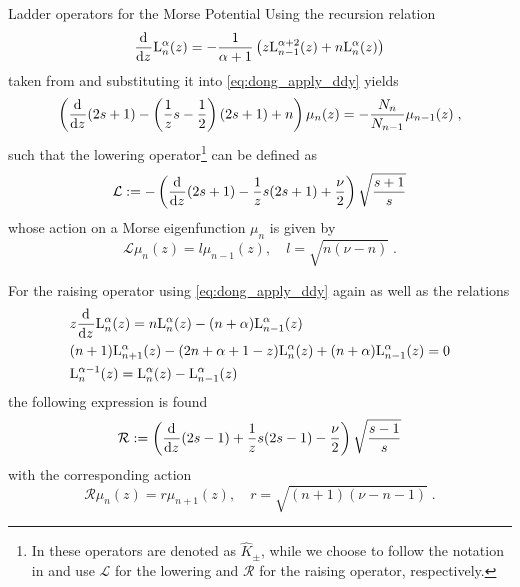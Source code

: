 \begin{chapter}{Ladder operators for the Morse Potential}
Using the recursion relation
\begin{equation}
	\label{eq:dong_ddy_rek}
	\frac{\mathrm{d}^{}}{\mathrm{d}z^{}}\mathrm{L}_{n}^\alpha(z)=-\frac{1}{\alpha+1}\left(z\mathrm{L}_{n-1}^{\alpha+2}(z)+n\mathrm{L}_{n}^\alpha(z)\right)
\end{equation}
taken from \cite{DongFactMethods} and substituting it into \eqref{eq:dong_apply_ddy} yields
\begin{equation}
    \left(\frac{\mathrm{d}^{}}{\mathrm{d}z^{}}(2s+1)-\left(\frac{1}{z}s-\frac{1}{2}\right)(2s+1)+n\right)\mu_n(z)=-\frac{N_n}{N_{n-1}}\mu_{n-1}(z) \;,
\end{equation}
such that the lowering operator\footnote{
    In \cite{Dong_ladder_operators} these operators are denoted as $\hat{K}_{\pm}$, while we choose to follow the notation in \cite{FGL_semiclassical_dynamics} 
    and use $\mathcal{L}$ for the lowering and $\mathcal{R}$ for the raising operator, respectively.}
can be defined as
\begin{equation}
    \label{eq:dong_lop}
    \mathcal{L}:=-\left(\frac{\mathrm{d}^{}}{\mathrm{d}z^{}}(2s+1)-\frac{1}{z}s(2s+1)+\frac{\nu}{2} \right)\sqrt{\frac{s+1}{s}}
\end{equation}
whose action on a Morse eigenfunction $\mu_n$ is given by
\begin{equation}
    \label{eq:dong_lop_action}
    \mathcal{L}\mu_n(z)=l\mu_{n-1}(z),\quad l=\sqrt{n(\nu-n)}\; .
\end{equation}

For the raising operator using \eqref{eq:dong_apply_ddy} again as well as the relations
\begin{align}
    &    z\frac{\mathrm{d}^{}}{\mathrm{d}z^{}}\mathrm{L}_n^\alpha(z)=n\mathrm{L}_n^{\alpha}(z)-(n+\alpha)\mathrm{L}_{n-1}^{\alpha}(z)\\
    &	(n+1)\mathrm{L}_{n+1}^{\alpha}(z)-(2n+\alpha+1-z)\mathrm{L}_n^{\alpha}(z)+(n+\alpha)\mathrm{L}_{n-1}^{\alpha}(z)=0\\
    &	\mathrm{L}_n^{\alpha-1}(z)=\mathrm{L}_n^{\alpha}(z)-\mathrm{L}_{n-1}^{\alpha}(z)
\end{align}
the following expression is found
\begin{equation}
    \label{eq:dong_rop}
    \mathcal{R}:=\left(\frac{\mathrm{d}^{}}{\mathrm{d}z^{}}(2s-1)+\frac{1}{z}s(2s-1)-\frac{\nu}{2} \right)\sqrt{\frac{s-1}{s}}
\end{equation}
with the corresponding action
\begin{equation}
    \label{eq:dong_rop_action}
    \mathcal{R}\mu_n(z)=r\mu_{n+1}(z),\quad r=\sqrt{(n+1)(\nu-n-1)}\; .
\end{equation}


\end{chapter}
